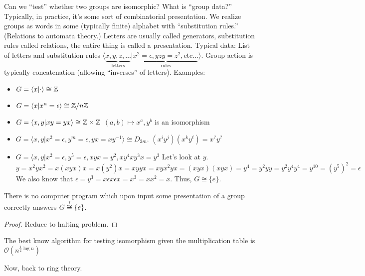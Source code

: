 \documentclass[notes.tex]{subfiles}
\begin{document}

\begin{remark}
	Can we ``test'' whether two groups are isomorphic?
	What is ``group data?'' Typically, in practice, it's some sort of combinatorial presentation. We realize groups as words in some (typically finite) alphabet with ``substitution rules.'' (Relations to automata theory.)
	Letters are usually called generators, substitution rules called relations, the entire thing is called a presentation.
	Typical data: List of letters and substitution rules 
	$\langle \underbrace{x, y, z, \ldots}_{\text{letters}} | \underbrace{x^2 = \epsilon, yzy = z^2, \text{etc...}}_{\text{rules}} \rangle$. Group action is typically concatenation (allowing ``inverses'' of letters). Examples:
	\begin{eg}\leavevmode
		\begin{itemize}
			\item $G = \langle x | \cdot \rangle \cong \mathbb{Z}$
			\item $G = \langle x | x^n = \epsilon \rangle \cong \mathbb{Z}/n\mathbb{Z}$
			\item $G = \langle x, y | xy = yx \rangle \cong \mathbb{Z} \times \mathbb{Z}$
			$(a, b)\mapsto x^a, y^b$ is an isomorphism
			\item $G = \langle x, y | x^2 = \epsilon, y^m=\epsilon, yx = xy^{-1} \rangle \cong D_{2m}$.
			$(x^iy^j)(x^ky^\ell) = x^?y^?$
			\item $G = \langle x, y | x^2=\epsilon, y^5=\epsilon, xyx=y^2, xy^4xy^3x = y^3$
			Let's look at $y$. $y=x^2yx^2= x(xyx)x=x(y^2)x=xyyx=xyx^2yx=(xyx)(xyx)=y^4=y^2yy=y^2y^4y^4 = y^{10}= (y^5)^2 = \epsilon$ We also know that $\epsilon=y^3 = x\epsilon x \epsilon x = x^3 = xx^2= x$. Thus, $G\cong\{e\}$.
		\end{itemize}
		\begin{theorem}
			There is no computer program which upon input some presentation of a group correctly answers $G\overop{\cong}{?}\{e\}$.
		\end{theorem}
		\begin{proof}
			Reduce to halting problem.
		\end{proof}
	\end{eg}
	The best know algorithm for testing isomorphism given the multiplication table is $\mathcal{O}(n^{\frac12\log n})$

	Now, back to ring theory.
\end{remark}
\end{document}
